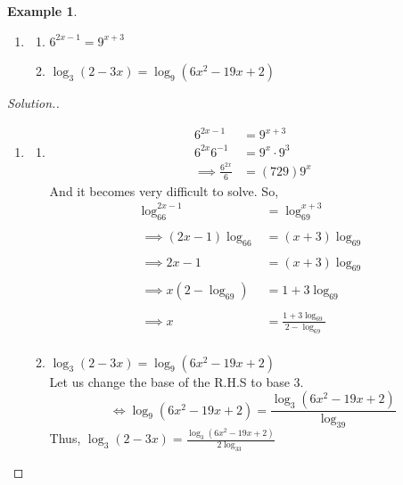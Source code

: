 \documentclass[11pt,a4paper]{article}
\theoremstyle{definition}
\newtheorem{example}[thm]{Example}
\newenvironment{solution}
  {\renewcommand{\qedsymbol}{}\begin{proof}[\textit{Solution}.]}
  {\end{proof}}
\begin{document}
\begin{example}

\begin{enumerate}
\item[]
\begin{enumerate}
       \item $6^{\displaystyle{2x-1}}=9^{\displaystyle{x+3}}$
       \item $\log_{\displaystyle{3}}(2-3x)=\log_{\displaystyle{9}}(6x^{\displaystyle{2}}-19x+2)$
\end{enumerate}
\end{enumerate}
\end{example}
\begin{solution}

\begin{enumerate}
\item[]
\begin{enumerate}
       \item


\begin{align*}
6^{2x-1} & = 9^{x+3}\\
6^{2x}6^{-1} & = 9^x\cdot 9^3\\
\implies \frac{6^{2x}}{6} & = (729)9^x
\end{align*}
And it becomes very difficult to solve. So,
\begin{align*}
\log_66^{2x-1} & = \log_69^{x+3}\\\\
\implies (2x-1)\log_66 & = (x+3)\log_69\\\\
\implies 2x-1 & = (x+3)\log_69\\\\
\implies x(2-\log_69) & = 1+3\log_69\\\\
\implies x & = \frac{1+3\log_69}{2-\log_69}\\
\end{align*}



        \item $\log_3(2-3x)=\log_9(6x^2-19x+2)$\\
        
Let us change the base of the R.H.S to base 3.
$$\iff \log_9(6x^2-19x+2)=\frac{\log_3(6x^2-19x+2)}{\log_39}$$
Thus, $\log_3(2-3x)=\frac{\log_3(6x^2-19x+2)}{2\log_33}$


\end{enumerate}
\end{enumerate}
\end{solution}
\end{document}
